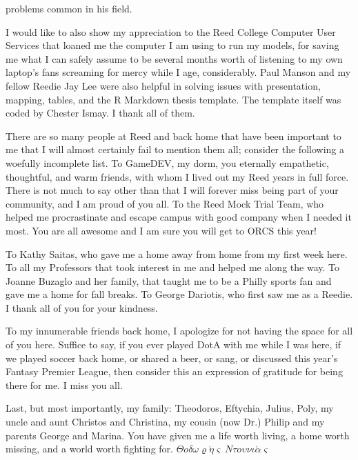 \documentclass[12pt,twoside]{reedthesis}
\begin{document}
\begin{preface}
      problems common in his field. \par I would like to also show my
      appreciation to the Reed College Computer User Services that loaned me
      the computer I am using to run my models, for saving me what I can
      safely assume to be several months worth of listening to my own laptop's
      fans screaming for mercy while I age, considerably. Paul Manson and my
      fellow Reedie Jay Lee were also helpful in solving issues with
      presentation, mapping, tables, and the R Markdown thesis template. The
      template itself was coded by Chester Ismay. I thank all of them.
      \par There are so many people at Reed and back home that have been
      important to me that I will almost certainly fail to mention them all;
      consider the following a woefully incomplete list. To GameDEV, my dorm,
      you eternally empathetic, thoughtful, and warm friends, with whom I
      lived out my Reed years in full force. There is not much to say other
      than that I will forever miss being part of your community, and I am
      proud of you all. To the Reed Mock Trial Team, who helped me
      procrastinate and escape campus with good company when I needed it most.
      You are all awesome and I am sure you will get to ORCS this year!
      \par To Kathy Saitas, who gave me a home away from home from my first
      week here. To all my Professors that took interest in me and helped me
      along the way. To Joanne Buzaglo and her family, that taught me to be a
      Philly sports fan and gave me a home for fall breaks. To George
      Dariotis, who first saw me as a Reedie. I thank all of you for your
      kindness. \par To my innumerable friends back home, I apologize for not
      having the space for all of you here. Suffice to say, if you ever played
      DotA with me while I was here, if we played soccer back home, or shared
      a beer, or sang, or discussed this year's Fantasy Premier League, then
      consider this an expression of gratitude for being there for me. I miss
      you all. \par Last, but most importantly, my family: Theodoros,
      Eftychia, Julius, Poly, my uncle and aunt Christos and Christina, my
      cousin (now Dr.) Philip and my parents George and Marina. You have given
      me a life worth living, a home worth missing, and a world worth fighting
      for.
      \(\Theta o \delta \omega \varrho\acute\eta\varsigma~N\tau o\upsilon \nu \iota \acute{\alpha}\varsigma\)
      \par
    \end{preface}
  
\end{document}
